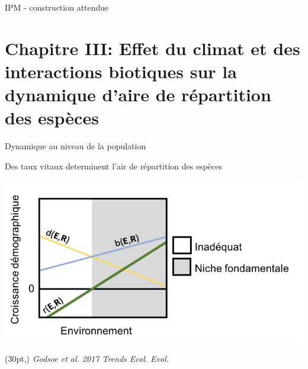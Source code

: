 \documentclass[11pt, compress, aspectratio=1610]{beamer}
\newcommand\smallcitation[1]{%
\begin{textblock*}{\textwidth}(30pt,\textheight)
	\raggedleft \footnotesize\textit{#1}
\end{textblock*}}
\begin{document}
\begin{frame}{IPM - construction attendue}
\protect\hypertarget{ipm---construction-attendue}{}



\end{frame}

\hypertarget{chapitre-iii-effet-du-climat-et-des-interactions-biotiques-sur-la-dynamique-daire-de-ruxe9partition-des-espuxe8ces}{%
\section{\texorpdfstring{Chapitre III: \newline Effet du climat et des
interactions biotiques sur la dynamique d’aire de répartition des
espèces}{Chapitre III: Effet du climat et des interactions biotiques sur la dynamique d’aire de répartition des espèces}}\label{chapitre-iii-effet-du-climat-et-des-interactions-biotiques-sur-la-dynamique-daire-de-ruxe9partition-des-espuxe8ces}}

\begin{frame}{Dynamique au niveau de la population}
\protect\hypertarget{dynamique-au-niveau-de-la-population}{}

Des taux vitaux determinent l’air de répartition des espèces

\centering

\includegraphics[scale=0.685]{figures/Godsoe2017a.png}

\par

\smallcitation{Godsoe et al. 2017 Trends Ecol. Evol.}

\end{frame}
\end{document}
